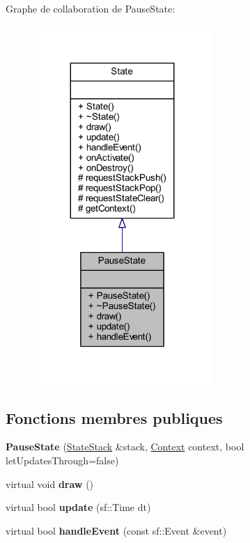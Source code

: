 Graphe de collaboration de Pause\+State\+:\nopagebreak
\begin{figure}[H]
\begin{center}
\leavevmode
\includegraphics[width=191pt]{class_pause_state__coll__graph}
\end{center}
\end{figure}
\subsection*{Fonctions membres publiques}
\begin{DoxyCompactItemize}
\item 
\hypertarget{class_pause_state_a742258269d21675b875ca205689aaa1c}{}\label{class_pause_state_a742258269d21675b875ca205689aaa1c} 
{\bfseries Pause\+State} (\hyperlink{class_state_stack}{State\+Stack} \&stack, \hyperlink{struct_state_1_1_context}{Context} context, bool let\+Updates\+Through=false)
\item 
\hypertarget{class_pause_state_ac4c159c2f6d32eedd351f39e36c43f9d}{}\label{class_pause_state_ac4c159c2f6d32eedd351f39e36c43f9d} 
virtual void {\bfseries draw} ()
\item 
\hypertarget{class_pause_state_a9d6e9c6d96e140487badbe1da2738fa3}{}\label{class_pause_state_a9d6e9c6d96e140487badbe1da2738fa3} 
virtual bool {\bfseries update} (sf\+::\+Time dt)
\item 
\hypertarget{class_pause_state_a685dda66dca3e1c41f4cb02da93c5a8d}{}\label{class_pause_state_a685dda66dca3e1c41f4cb02da93c5a8d} 
virtual bool {\bfseries handle\+Event} (const sf\+::\+Event \&event)
\end{DoxyCompactItemize}
